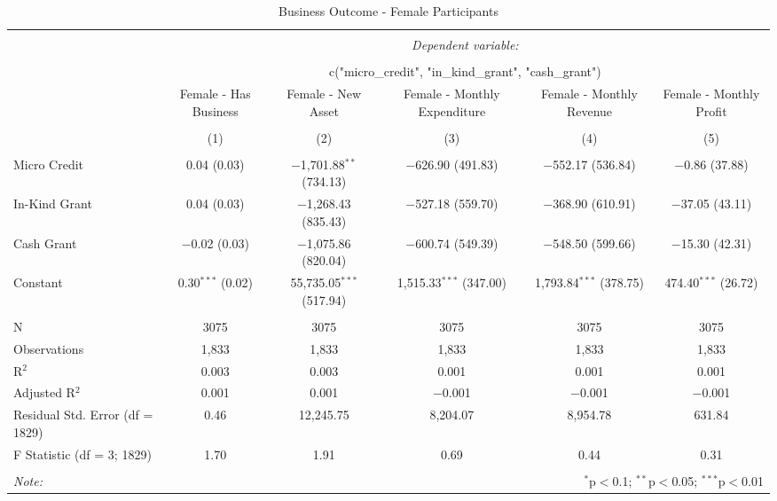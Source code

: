 
\begin{table}[!htbp] \centering 
  \caption{Business Outcome - Female Participants} 
  \label{} 
\small 
\begin{tabular}{@{\extracolsep{5pt}}lccccc} 
\\[-1.8ex]\hline 
\hline \\[-1.8ex] 
 & \multicolumn{5}{c}{\textit{Dependent variable:}} \\ 
\cline{2-6} 
\\[-1.8ex] & \multicolumn{5}{c}{c("micro\_credit", "in\_kind\_grant", "cash\_grant")} \\ 
 & Female - Has Business & Female - New Asset & Female - Monthly Expenditure & Female - Monthly Revenue & Female - Monthly Profit \\ 
\\[-1.8ex] & (1) & (2) & (3) & (4) & (5)\\ 
\hline \\[-1.8ex] 
 Micro Credit & 0.04 (0.03) & $-$1,701.88$^{**}$ (734.13) & $-$626.90 (491.83) & $-$552.17 (536.84) & $-$0.86 (37.88) \\ 
  In-Kind Grant & 0.04 (0.03) & $-$1,268.43 (835.43) & $-$527.18 (559.70) & $-$368.90 (610.91) & $-$37.05 (43.11) \\ 
  Cash Grant & $-$0.02 (0.03) & $-$1,075.86 (820.04) & $-$600.74 (549.39) & $-$548.50 (599.66) & $-$15.30 (42.31) \\ 
  Constant & 0.30$^{***}$ (0.02) & 55,735.05$^{***}$ (517.94) & 1,515.33$^{***}$ (347.00) & 1,793.84$^{***}$ (378.75) & 474.40$^{***}$ (26.72) \\ 
 \hline \\[-1.8ex] 
N & 3075 & 3075 & 3075 & 3075 & 3075 \\ 
Observations & 1,833 & 1,833 & 1,833 & 1,833 & 1,833 \\ 
R$^{2}$ & 0.003 & 0.003 & 0.001 & 0.001 & 0.001 \\ 
Adjusted R$^{2}$ & 0.001 & 0.001 & $-$0.001 & $-$0.001 & $-$0.001 \\ 
Residual Std. Error (df = 1829) & 0.46 & 12,245.75 & 8,204.07 & 8,954.78 & 631.84 \\ 
F Statistic (df = 3; 1829) & 1.70 & 1.91 & 0.69 & 0.44 & 0.31 \\ 
\hline 
\hline \\[-1.8ex] 
\textit{Note:}  & \multicolumn{5}{r}{$^{*}$p$<$0.1; $^{**}$p$<$0.05; $^{***}$p$<$0.01} \\ 
\end{tabular} 
\end{table} 
